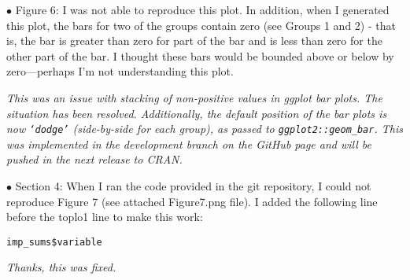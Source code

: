 \documentclass[letterpaper,12pt]{article}
\begin{document}
$\bullet$ Figure 6:  I was not able to reproduce this plot.  In addition, when I generated this plot, the bars for two of the groups contain zero (see Groups 1 and 2) - that is, the bar is greater than zero for part of the bar and is less than zero for the other part of the bar.   I thought these bars would be bounded above or below by zero—perhaps I'm not understanding this plot.

{\it This was an issue with stacking of non-positive values in ggplot bar plots.  The situation has been resolved.  Additionally, the default position of the bar plots is now \texttt{`dodge'} (side-by-side for each group), as passed to \texttt{ggplot2::geom\_bar}.  This was implemented in the development branch on the GitHub page and will be pushed in the next release to CRAN.}

$\bullet$ Section 4:  When I ran the code provided in the git repository, I could not reproduce Figure 7 (see attached Figure7.png file).  I added the following line before the toplo1 line to make this work:

\texttt{imp\_sums\$variable}

{\it Thanks, this was fixed.}
\end{document}
